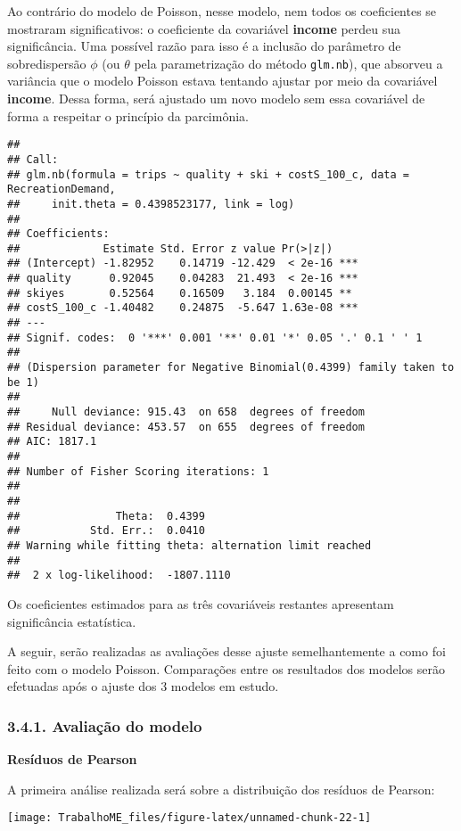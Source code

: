 \documentclass[
]{article}
\begin{document}
Ao contrário do modelo de Poisson, nesse modelo, nem todos os
coeficientes se mostraram significativos: o coeficiente da covariável
\textbf{income} perdeu sua significância. Uma possível razão para isso é
a inclusão do parâmetro de sobredispersão \(\phi\) (ou \(\theta\) pela
parametrização do método \texttt{glm.nb}), que absorveu a variância que
o modelo Poisson estava tentando ajustar por meio da covariável
\textbf{income}. Dessa forma, será ajustado um novo modelo sem essa
covariável de forma a respeitar o princípio da parcimônia.

\begin{verbatim}
## 
## Call:
## glm.nb(formula = trips ~ quality + ski + costS_100_c, data = RecreationDemand, 
##     init.theta = 0.4398523177, link = log)
## 
## Coefficients:
##             Estimate Std. Error z value Pr(>|z|)    
## (Intercept) -1.82952    0.14719 -12.429  < 2e-16 ***
## quality      0.92045    0.04283  21.493  < 2e-16 ***
## skiyes       0.52564    0.16509   3.184  0.00145 ** 
## costS_100_c -1.40482    0.24875  -5.647 1.63e-08 ***
## ---
## Signif. codes:  0 '***' 0.001 '**' 0.01 '*' 0.05 '.' 0.1 ' ' 1
## 
## (Dispersion parameter for Negative Binomial(0.4399) family taken to be 1)
## 
##     Null deviance: 915.43  on 658  degrees of freedom
## Residual deviance: 453.57  on 655  degrees of freedom
## AIC: 1817.1
## 
## Number of Fisher Scoring iterations: 1
## 
## 
##               Theta:  0.4399 
##           Std. Err.:  0.0410 
## Warning while fitting theta: alternation limit reached 
## 
##  2 x log-likelihood:  -1807.1110
\end{verbatim}

Os coeficientes estimados para as três covariáveis restantes apresentam
significância estatística.

A seguir, serão realizadas as avaliações desse ajuste semelhantemente a
como foi feito com o modelo Poisson. Comparações entre os resultados dos
modelos serão efetuadas após o ajuste dos 3 modelos em estudo.

\subsubsection{3.4.1. Avaliação do
modelo}\label{avaliauxe7uxe3o-do-modelo-1}

\textbf{Resíduos de Pearson}

A primeira análise realizada será sobre a distribuição dos resíduos de
Pearson:

\begin{center}\texttt{[image: TrabalhoME\_files/figure-latex/unnamed-chunk-22-1]} \end{center}
\end{document}
